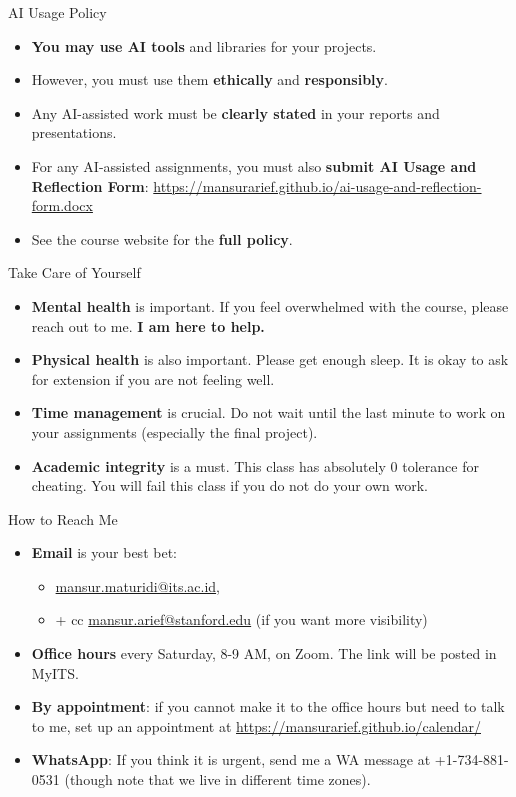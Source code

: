 \documentclass [xcolor=svgnames, handout]{beamer}
\begin{document}
\begin{frame}{AI Usage Policy}
    \begin{itemize}[<+->]
        \item \textbf{You may use AI tools} and libraries for your projects.
        \item However, you must use them \textbf{ethically} and \textbf{responsibly}.
        \item Any AI-assisted work must be \textbf{clearly stated} in your reports and presentations.
        \item For any AI-assisted assignments, you must also \textbf{submit AI Usage and Reflection Form}: \url{https://mansurarief.github.io/ai-usage-and-reflection-form.docx}
        \item See the course website for the \textbf{full policy}.
    \end{itemize}
\end{frame}

\begin{frame}{Take Care of Yourself}
    \begin{itemize}[<+->]
        \item \textbf{Mental health} is important. If you feel overwhelmed with the course, please reach out to me. \textbf{I am here to help.}
        \item \textbf{Physical health} is also important. Please get enough sleep. It is okay to ask for extension if you are not feeling well.
        \item \textbf{Time management} is crucial. Do not wait until the last minute to work on your assignments (especially the final project).
        \item \textbf{Academic integrity} is a must. This class has absolutely 0 tolerance for cheating. You will fail this class if you do not do your own work.
    \end{itemize}
\end{frame}

\begin{frame}{How to Reach Me}
    \begin{itemize}[<+->]
        \item \textbf{Email} is your best bet: 
        \begin{itemize}
            \item \url{mansur.maturidi@its.ac.id}, 
            \item + cc \url{mansur.arief@stanford.edu} (if you want more visibility)
        \end{itemize}
        \item \textbf{Office hours} every Saturday, 8-9 AM, on Zoom. The link will be posted in MyITS.
        \item \textbf{By appointment}: if you cannot make it to the office hours but need to talk to me, set up an appointment at \url{https://mansurarief.github.io/calendar/}
        \item \textbf{WhatsApp}: If you think it is urgent, send me a WA message at +1-734-881-0531 (though note that we live in different time zones).
    \end{itemize}
\end{frame}
\end{document}
